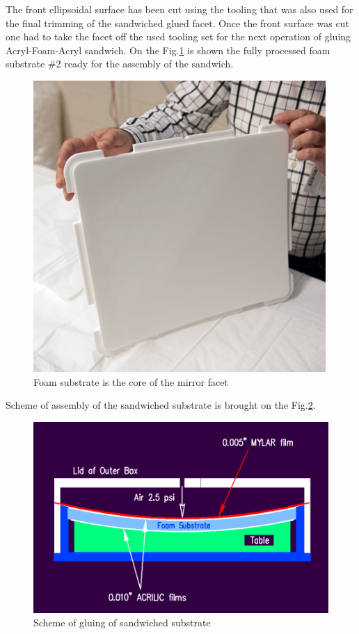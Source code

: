 The front ellipsoidal surface has been cut using the tooling that was also used for the final trimming of the sandwiched glued facet. Once the front surface was cut one had to take the facet off the used tooling set for the next operation of gluing Acryl-Foam-Acryl sandwich. On the Fig.\ref{fig:Foam_Sub} is shown the fully processed foam substrate \#2 ready for the assembly of the sandwich. 

\begin{figure}[ht]
    \centering
    \includegraphics[width=0.9\linewidth]{images/Foam_Sub.png}
    \caption{Foam substrate is the core of the mirror facet}
    \label{fig:Foam_Sub}
\end{figure}

Scheme of assembly of the sandwiched substrate is brought on the Fig.\ref{fig:Gluing_Sandwich}.

\begin{figure}[ht]
    \centering
    \includegraphics[width=0.9\linewidth]{images/Gluing_Sandwich_New.png}
    \caption{Scheme of gluing of sandwiched substrate}
    \label{fig:Gluing_Sandwich}
\end{figure}

